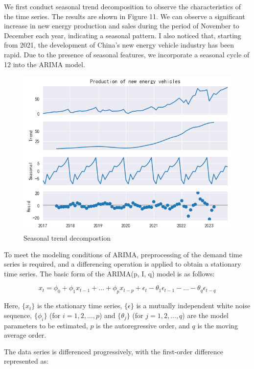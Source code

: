 \documentclass{apmcmthesis}
\begin{document}
We first conduct seasonal trend decomposition to observe the characteristics of the time series. The results are shown in Figure 11. We can observe a significant increase in new energy production and sales during the period of November to December each year, indicating a seasonal pattern. I also noticed that, starting from 2021, the development of China's new energy vehicle industry has been rapid. Due to the presence of seasonal features, we incorporate a seasonal cycle of 12 into the ARIMA model.
\begin{figure}[htbp]
    \centering
    \includegraphics[scale=0.8]{figures/Figure/seasonal_decompose.png}
    \caption{Seasonal trend decompostion}
\end{figure}
To meet the modeling conditions of ARIMA, preprocessing of the demand time series is required, and a differencing operation is applied to obtain a stationary time series. The basic form of the ARIMA(p, I, q) model is as follows:

\[ x_t = \phi_0 + \phi_1 x_{t-1} + \ldots + \phi_p x_{t-p} + \epsilon_t - \theta_1 \epsilon_{t-1} - \ldots - \theta_q \epsilon_{t-q} \]

Here, \( \{x_t\} \) is the stationary time series, \( \{\epsilon\} \) is a mutually independent white noise sequence, \( \{\phi_i\} \) (for \(i = 1, 2, \ldots, p\)) and \( \{\theta_j\} \) (for \(j = 1, 2, \ldots, q\)) are the model parameters to be estimated, \(p\) is the autoregressive order, and \(q\) is the moving average order.

The data series is differenced progressively, with the first-order difference represented as:
\end{document}
